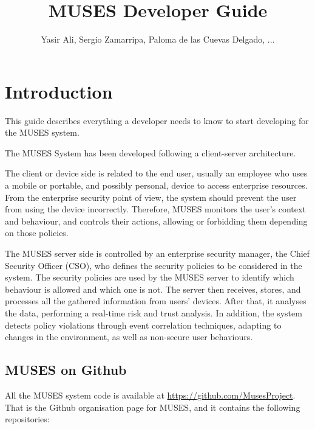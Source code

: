 \documentclass[a4paper,11pt]{book}
\title{MUSES Developer Guide}
\author{Yasir Ali, Sergio Zamarripa, Paloma de las Cuevas Delgado, ...}
\begin{document}
\maketitle
\tableofcontents

\chapter{Introduction}
\label{ch:intro}

This guide describes everything a developer needs to know to start developing for the MUSES system.

The MUSES System \cite{deliverable21} has been developed following a client-server architecture.
 
The client or device side is related to the end user, usually an employee who uses a mobile or portable, and possibly
personal, device to access enterprise resources. From the enterprise security point of view, the system should prevent the user from using the device incorrectly. Therefore, MUSES monitors the user's context and behaviour, and controls their actions, allowing or forbidding them depending on those policies.

The MUSES server side is controlled by an enterprise security manager, the Chief Security Officer (CSO), who defines the security policies to be considered in the system. The security policies are used by the MUSES server to identify which behaviour is allowed and which one is not. The server then receives, stores, and processes all the gathered information from users' devices. After that, it analyses the data, performing a real-time risk and trust analysis. In addition, the system detects policy violations through event correlation techniques, adapting to changes in the environment, as well as non-secure user behaviours.

\section{MUSES on Github}
\label{sec:musesgit}

All the MUSES system code is available at \url{https://github.com/MusesProject}. That is the Github organisation page for MUSES, and it contains the following repositories:
\end{document}
